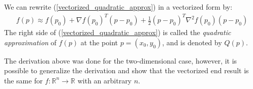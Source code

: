 We can rewrite (\ref{vectorized_quadratic_approx}) in a vectorized form by:
\begin{equation}\label{vectorized_quadratic_approx}
\begin{split}
f\left(p\right) \approx f\left(p_0\right) + \nabla f\left(p_0\right)^T\left(p-p_0\right) + \frac{1}{2}\left(p-p_0\right)^T\nabla^2 f\left(p_0\right)\left(p-p_0\right)
\end{split}
\end{equation}
\noindent The right side of (\ref{vectorized_quadratic_approx}) is called the \emph{quadratic approximation} of $f(p)$ at the point $p=(x_0, y_0)$, and is denoted by $Q(p)$.

\noindent The derivation above was done for the two-dimensional case, however, it is possible to generalize the derivation and show that the vectorized end result is the same for $f:\mathbb{R}^n\rightarrow\mathbb{R}$ with an arbitrary $n$.

